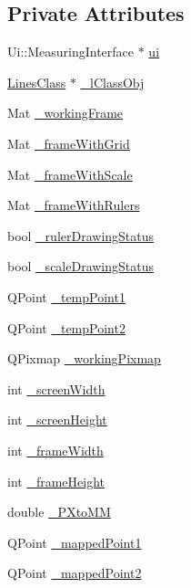 \subsection*{Private Attributes}
\begin{DoxyCompactItemize}
\item 
Ui\+::\+Measuring\+Interface $\ast$ \mbox{\hyperlink{class_measuring_interface_a6f8e1020a154cb26eb10d3755130e22f}{ui}}
\item 
\mbox{\hyperlink{class_lines_class}{Lines\+Class}} $\ast$ \mbox{\hyperlink{class_measuring_interface_a9041174b9059c7c9ac971f0a6c67e551}{\+\_\+l\+Class\+Obj}}
\item 
Mat \mbox{\hyperlink{class_measuring_interface_aaedd365e7de53beea419a6ae95f63ac5}{\+\_\+working\+Frame}}
\item 
Mat \mbox{\hyperlink{class_measuring_interface_a0b2423351c5a351110df2db168394aac}{\+\_\+frame\+With\+Grid}}
\item 
Mat \mbox{\hyperlink{class_measuring_interface_ae48829083f032ec2a2901ef1ee0cdbff}{\+\_\+frame\+With\+Scale}}
\item 
Mat \mbox{\hyperlink{class_measuring_interface_a0c84bf7462820d0185b7933f708a5b78}{\+\_\+frame\+With\+Rulers}}
\item 
bool \mbox{\hyperlink{class_measuring_interface_ac165bee9175399843d34797f9959aab9}{\+\_\+ruler\+Drawing\+Status}}
\item 
bool \mbox{\hyperlink{class_measuring_interface_a383a71c4ec7a3dc4d22fdb1b298d6755}{\+\_\+scale\+Drawing\+Status}}
\item 
Q\+Point \mbox{\hyperlink{class_measuring_interface_afc55152e0f55babf36912f7b266df1d7}{\+\_\+temp\+Point1}}
\item 
Q\+Point \mbox{\hyperlink{class_measuring_interface_a0b492738da676dc2d7659f47f43ce755}{\+\_\+temp\+Point2}}
\item 
Q\+Pixmap \mbox{\hyperlink{class_measuring_interface_a2c02a44d7418c991870d586336d1b30f}{\+\_\+working\+Pixmap}}
\item 
int \mbox{\hyperlink{class_measuring_interface_a420b43490b911817514f5d0164f67f72}{\+\_\+screen\+Width}}
\item 
int \mbox{\hyperlink{class_measuring_interface_a0f1f2b4d7b3351b923d4a45c3726ad3f}{\+\_\+screen\+Height}}
\item 
int \mbox{\hyperlink{class_measuring_interface_abd25849865da846f5fcd8d253dec2158}{\+\_\+frame\+Width}}
\item 
int \mbox{\hyperlink{class_measuring_interface_ad5df82a497791ea7bbf03548f389cb5b}{\+\_\+frame\+Height}}
\item 
double \mbox{\hyperlink{class_measuring_interface_a9424e09f5caa438c903c919618a2bf28}{\+\_\+\+P\+Xto\+MM}}
\item 
Q\+Point \mbox{\hyperlink{class_measuring_interface_a4b23773d20cd818a16eb73b3c20d42ba}{\+\_\+mapped\+Point1}}
\item 
Q\+Point \mbox{\hyperlink{class_measuring_interface_ad387f8c8650644bdb62f73372e1e617a}{\+\_\+mapped\+Point2}}
\end{DoxyCompactItemize}


